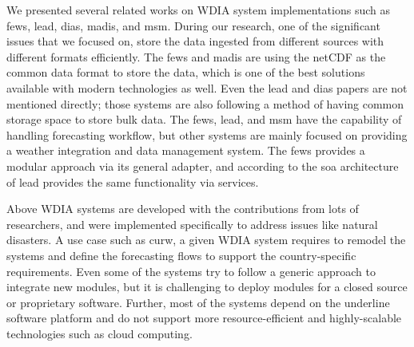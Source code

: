 We presented several related works on WDIA system implementations such as \acrshort{fews}, \acrshort{lead}, \acrshort{dias}, \acrshort{madis}, and \acrshort{msm}. During our research, one of the significant issues that we focused on, store the data ingested from different sources with different formats efficiently. The \acrshort{fews} and \acrshort{madis} are using the netCDF as the common data format to store the data, which is one of the best solutions available with modern technologies as well. Even the \acrshort{lead} and \acrshort{dias} papers are not mentioned directly; those systems are also following a method of having common storage space to store bulk data. The \acrshort{fews}, \acrshort{lead}, and \acrshort{msm} have the capability of handling forecasting workflow, but other systems are mainly focused on providing a weather integration and data management system. The \acrshort{fews} provides a modular approach via its general adapter, and according to the \acrshort{soa} architecture of \acrshort{lead} provides the same functionality via services.

Above WDIA systems are developed with the contributions from lots of researchers, and were implemented specifically to address issues like natural disasters. A use case such as \acrshort{curw}, a given WDIA system requires to remodel the systems and define the forecasting flows to support the country-specific requirements. Even some of the systems try to follow a generic approach to integrate new modules, but it is challenging to deploy modules for a closed source or proprietary software. Further, most of the systems depend on the underline software platform and do not support more resource-efficient and highly-scalable technologies such as cloud computing.
